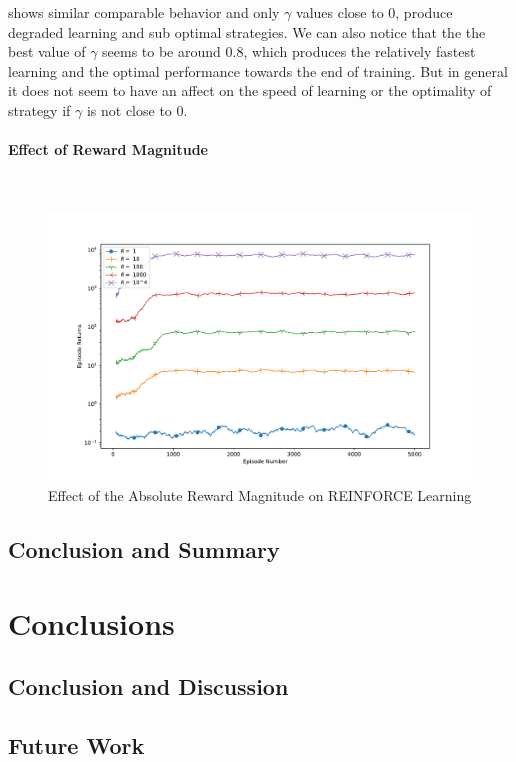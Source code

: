 \documentclass[14pt]{extarticle}
\newcommand{\myparagraph}[1]{\paragraph{#1}\mbox{}\\ \linebreak}
\numberwithin{equation}{section}
\begin{document}
shows similar comparable behavior and only $\gamma$ values close to 0, produce degraded learning and sub optimal strategies. We can also notice that the the best value of $\gamma$ seems to be around 0.8, which produces the relatively fastest learning and the optimal performance towards the end of training. But in general it does not seem to have an affect on the speed of learning or the optimality of strategy if $\gamma$ is not close to 0.
\myparagraph{Effect of Reward Magnitude}

	\begin{figure}[H]
	\hspace*{-3.25cm}   
	\centering
	\includegraphics[scale=0.8]{reinforce_reward_mag.pdf}
	\caption{Effect of the Absolute Reward Magnitude on REINFORCE Learning
		\label{reinforce_reward_mag}}
\end{figure}
\subsection{Conclusion and Summary}




\section{Conclusions}
\subsection{Conclusion and Discussion}
\subsection{Future Work}


	\clearpage
	
	
\end{document}
